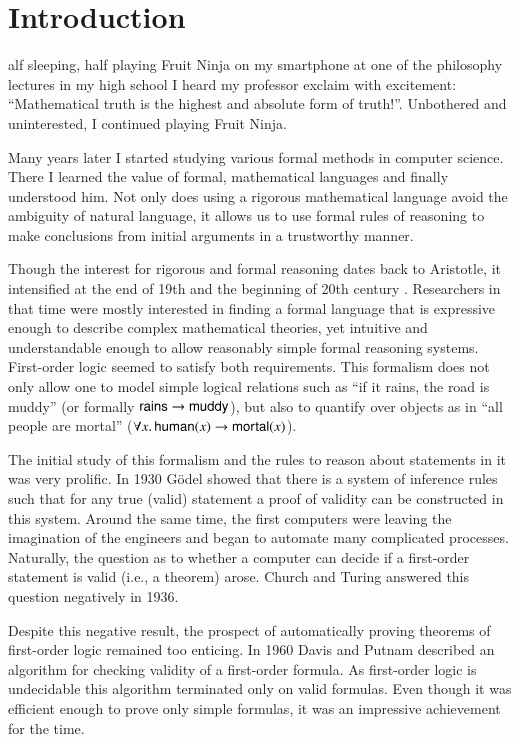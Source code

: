 \chapter{Introduction}
\label{introduction}

alf sleeping, half playing Fruit Ninja on my smartphone at one of the
philosophy lectures in my high school I heard my professor exclaim with
excitement: “Mathematical truth is the highest and absolute form of truth!”.
Unbothered and uninterested, I continued playing Fruit Ninja.

Many years later I started studying various formal methods in computer science.
There I learned the value of formal, mathematical languages and finally
understood him. Not only does using a rigorous mathematical language avoid the
ambiguity of natural language, it allows us to use formal rules of reasoning to
make conclusions from initial arguments in a trustworthy manner. 

Though the interest for rigorous and formal reasoning dates back to Aristotle,
it intensified at the end of 19th and the beginning of 20th century
\cite{jf-01-modern-logic}. Researchers in that time were mostly interested in
finding a formal language that is expressive enough to describe complex
mathematical theories, yet intuitive and understandable enough to allow
reasonably simple formal reasoning systems. First-order logic seemed to satisfy
both requirements.  This formalism does not only allow one to model simple
logical relations such as ``if it rains, the road is muddy'' (or formally
$\mathsf{rains} \rightarrow \mathsf{muddy}$), but also to quantify over objects as in ``all
people are mortal'' ($\forall x.\, \mathsf{human}(x) \rightarrow \mathsf{mortal}(x)$).

The initial study of this formalism and the rules to reason about statements in
it was very prolific. In 1930 G\"odel \cite{kg-30-completeness-theorem} showed
that there is a system of inference rules such that for any true (valid) statement a
proof of validity can be constructed in this system. Around the same time, the
first computers were leaving the imagination of the engineers and began to
automate many complicated processes.  Naturally, the question as to  whether a
computer can decide if a first-order statement is valid (i.e., a theorem) arose.
Church \cite{ac-36-fol-undecidable} and Turing \cite{tm-37-undecidable} answered
this question negatively in 1936.

Despite this negative result, the prospect of automatically proving theorems of
first-order logic remained too enticing. In 1960 Davis and Putnam
\cite{dp-1960-dpll} described an algorithm for checking validity of a
first-order formula. As first-order logic is undecidable this algorithm
terminated only on valid formulas. Even though it was efficient enough to prove
only simple formulas, it was an impressive achievement for the time.

